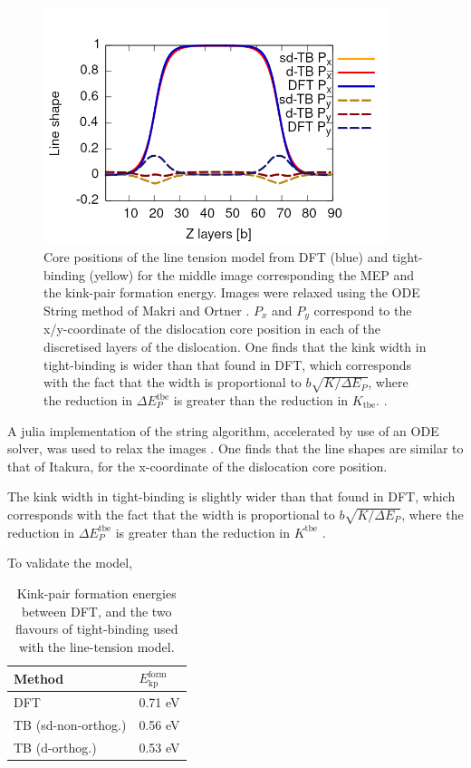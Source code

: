 \documentclass[a4paper,11pt]{article}
\begin{document}
\begin{figure}[htbp]

\includegraphics[width=0.9\textwidth]{Images/lineshape-all_correct_gradient.png}
\caption{Core positions of the line tension model from DFT (blue) and tight-binding (yellow) for the middle image corresponding the MEP and the kink-pair formation energy. Images were relaxed using the ODE String method of Makri and Ortner \cite{Makri2019}. \(P_x\) and \(P_y\) correspond to the x/y-coordinate of the dislocation core position in each of the discretised layers of the dislocation. One finds that the kink width in tight-binding is wider than that found in DFT, which corresponds with the fact that the width is proportional to \(b\sqrt{K/\Delta E_P}\), where the reduction in \(\Delta E_P^{\text{tbe}}\) is greater than the reduction in \(K_{\text{tbe}}\).   \label{lineshape}.}
\end{figure}

A julia implementation of the string algorithm, accelerated by use
of an ODE solver, was used to relax the images \cite{Makri2019}. One finds that the line
shapes are similar to that of Itakura, for the x-coordinate of the
dislocation core position.

The kink width in tight-binding is slightly wider than that found in DFT, which
corresponds with the fact that the width is proportional to \(b\sqrt{K/\Delta E_P}\), where the
reduction in \(\Delta E_P^{\text{tbe}}\) is greater than the reduction in \(K^{\text{tbe}}\) \cite{Itakura2012}. 

To validate the model, 

\begin{table}[htbp]
\caption{Kink-pair formation energies between DFT, and the two flavours of tight-binding used with the line-tension model.}
\centering
\begin{tabular}{ll}
Method & \(E_{\text{kp}}^{\text{form}}\)\\
\hline
DFT & 0.71 eV\\
TB (sd-non-orthog.) & 0.56 eV\\
TB (d-orthog.) & 0.53 eV\\
\end{tabular}
\end{table}
\end{document}

